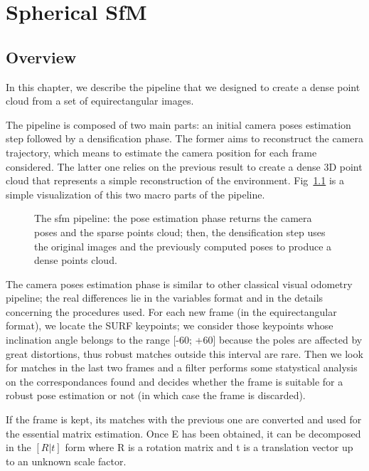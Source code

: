 \chapter{Spherical SfM}
\section{Overview}
In this chapter, we describe the pipeline that we designed to create a dense point cloud from a set of equirectangular images.

The pipeline is composed of two main parts: an initial camera poses estimation
step followed by a densification phase. The former aims to reconstruct the 
camera trajectory, which means to estimate the camera position for each frame 
considered. The latter one relies on the previous result to create a dense 
3D point cloud that represents a simple reconstruction of the environment.
Fig~\ref{fig:pipeline_overview}
is a simple visualization of this two macro parts of the 
pipeline.
\begin{figure}
	\label{fig:pipeline_overview}
    \centering
    \def\svgwidth{\columnwidth}
    
    \caption{The sfm pipeline: the pose estimation phase returns the camera 
    poses and the sparse points cloud; then, the densification step uses 
    the original images and the previously computed poses to produce a dense 
    points cloud.}
\end{figure}

The camera poses estimation phase is similar to other classical visual 
odometry pipeline; the real differences lie in the variables format and in 
the details concerning the procedures used. For each new frame 
(in the equirectangular format), we locate the
SURF keypoints; we consider those keypoints whose inclination angle belongs 
to the range [-60\degree; +60\degree] because the poles are affected by great 
distortions, thus robust matches outside this interval are rare.
Then we look for matches in the last two frames and a filter performs some 
statystical analysis on the correspondances found and decides whether the frame 
is suitable for a robust pose estimation or not (in which case the frame is 
discarded).

If the frame is kept, its matches with the previous one are converted
and used for the essential matrix estimation. Once E has been obtained, 
it can be decomposed in the \([R|t]\) form where R is a rotation matrix 
and t is a translation vector up to an unknown scale factor.

